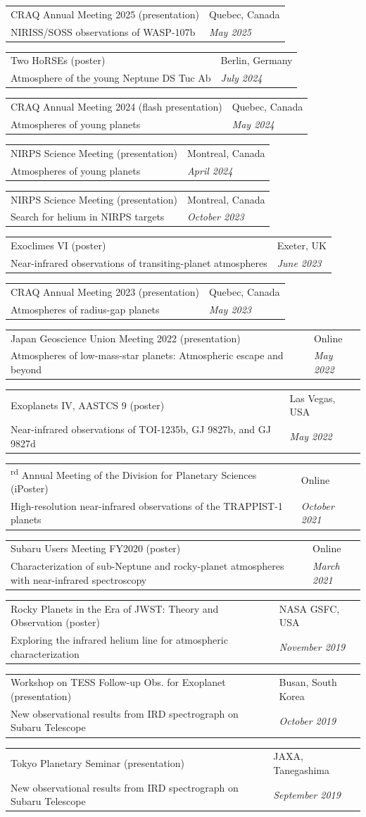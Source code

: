 \documentclass[10pt,a4paper]{article}
\makeatletter
\newcommand{\presentationentry}[4]{%
\begin{tabularx}{\textwidth}{
    @{}
    >{\raggedright\arraybackslash}X
    >{\raggedleft\arraybackslash}p{4.0cm}
    @{}
}
#1 & #2 \\
\textcolor{entrylight}{#3} &
\textcolor{entrylight}{\emph{#4}}
\end{tabularx}
\vspace{2pt}
}
\makeatother
\begin{document}
\presentationentry
{CRAQ Annual Meeting 2025 (presentation)}
{Quebec, Canada}
{NIRISS/SOSS observations of WASP-107b}
{May 2025}

\presentationentry
{Two HoRSEs (poster)}
{Berlin, Germany}
{Atmosphere of the young Neptune DS Tuc Ab}
{July 2024}

\presentationentry
{CRAQ Annual Meeting 2024 (flash presentation)}
{Quebec, Canada}
{Atmospheres of young planets}
{May 2024}

\presentationentry
{NIRPS Science Meeting (presentation)}
{Montreal, Canada}
{Atmospheres of young planets}
{April 2024}

\presentationentry
{NIRPS Science Meeting (presentation)}
{Montreal, Canada}
{Search for helium in NIRPS targets}
{October 2023}

\presentationentry
{Exoclimes VI (poster)}
{Exeter, UK}
{Near-infrared observations of transiting-planet atmospheres}
{June 2023}

\presentationentry
{CRAQ Annual Meeting 2023 (presentation)}
{Quebec, Canada}
{Atmospheres of radius-gap planets}
{May 2023}

\presentationentry
{Japan Geoscience Union Meeting 2022 (presentation)}
{Online}
{Atmospheres of low-mass-star planets: Atmospheric escape and beyond}
{May 2022}

\presentationentry
{Exoplanets IV, AASTCS 9 (poster)}
{Las Vegas, USA}
{Near-infrared observations of TOI-1235b, GJ 9827b, and GJ 9827d}
{May 2022}

\presentationentry
{53\textsuperscript{rd} Annual Meeting of the Division for Planetary Sciences (iPoster)}
{Online}
{High-resolution near-infrared observations of the TRAPPIST-1 planets}
{October 2021}

\presentationentry
{Subaru Users Meeting FY2020 (poster)}
{Online}
{Characterization of sub-Neptune and rocky-planet atmospheres with near-infrared spectroscopy}
{March 2021}

\presentationentry
{Rocky Planets in the Era of JWST: Theory and Observation (poster)}
{NASA GSFC, USA}
{Exploring the infrared helium line for atmospheric characterization}
{November 2019}

\presentationentry
{Workshop on TESS Follow-up Obs. for Exoplanet (presentation)}
{Busan, South Korea}
{New observational results from IRD spectrograph on Subaru Telescope}
{October 2019}

\presentationentry
{Tokyo Planetary Seminar (presentation)}
{JAXA, Tanegashima}
{New observational results from IRD spectrograph on Subaru Telescope}
{September 2019}
\end{document}
